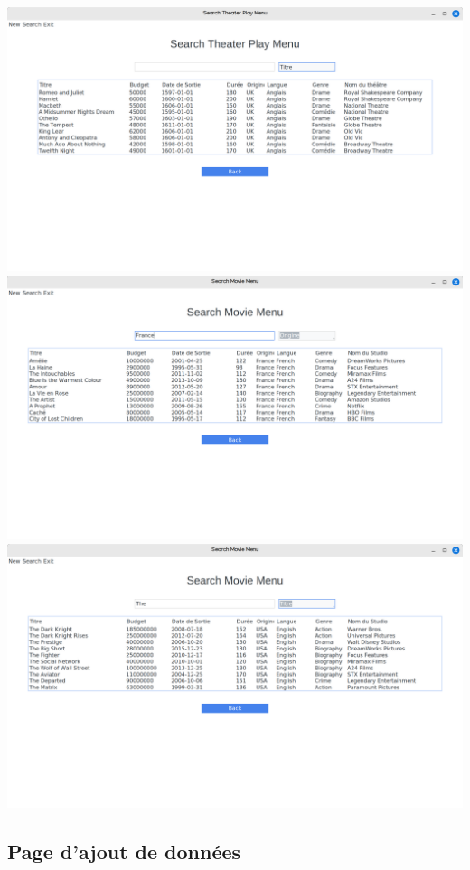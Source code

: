 \documentclass{article}
\newcommand{\n}{\\ [6pt]}
\begin{document}
\begin{center}
  \includegraphics[scale=0.16]{searchplay.png}\n
  \includegraphics[scale=0.16]{searchmovies1.png}\n
  \includegraphics[scale=0.16]{searchmovies2.png}
\end{center}

\newpage

\subsection{Page d'ajout de données}
\end{document}
